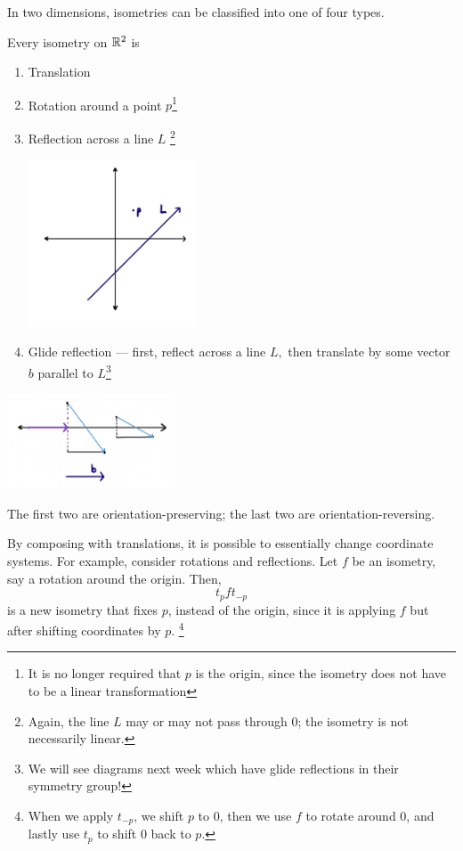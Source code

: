 In two dimensions, isometries can be classified into one of four types.
\begin{theorem}\label{isometry four}
Every isometry on $\mathbb R^2$ is 
\begin{enumerate}
    \item Translation
    \item Rotation around a point $p$\footnote{It is no longer required that $p$ is the origin, since the isometry does not have to be a linear transformation}
    \item Reflection across a line $L$ \footnote{Again, the line $L$ may or may not pass through 0; the isometry is not necessarily linear.}
    
    \begin{center}
        \includegraphics[width=5cm]{Lecture Files and Images/lec13-1a.png}
    \end{center}

    \item Glide reflection --- first, reflect across a line $L,$ then translate by some vector $b$ parallel to $L$\footnote{We will see diagrams next week which have glide reflections in their symmetry group!}
\end{enumerate}
\begin{center}
 \includegraphics[width=5cm]{Lecture Files and Images/lec13-1b.png}
\end{center}
\end{theorem}

The first two are orientation-preserving; the last two are orientation-reversing. 

By composing with translations, it is possible to essentially change coordinate systems. For example, consider rotations and reflections. Let $f$ be an isometry, say a rotation around the origin. Then, 
\[
t_p f t_{-p}
\]
is a new isometry that fixes $p$, instead of the origin, since it is applying $f$ but after shifting coordinates by $p.$ \footnote{When we apply $t_{-p}$, we shift $p$ to 0, then we use $f$ to rotate around 0, and lastly use $t_p$ to shift $0$ back to $p.$} 

